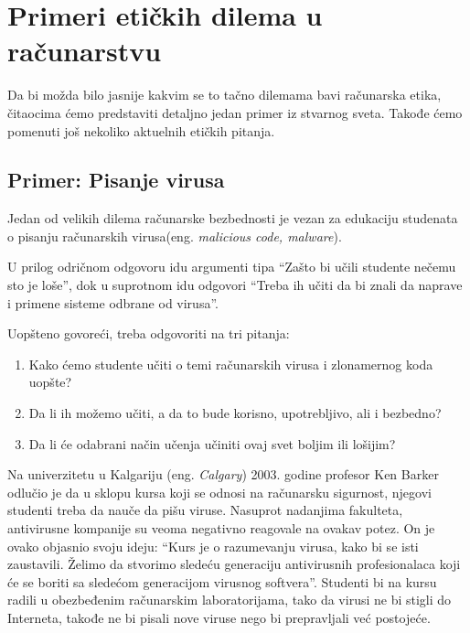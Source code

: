 \documentclass[a4paper]{article}
\begin{document}

\section{Primeri etičkih dilema u računarstvu}

Da bi možda bilo jasnije kakvim se to tačno dilemama bavi računarska etika, čitaocima ćemo predstaviti detaljno jedan primer iz stvarnog sveta. Takođe ćemo pomenuti još nekoliko aktuelnih etičkih pitanja.

\subsection{Primer: Pisanje virusa}
Jedan od velikih dilema računarske bezbednosti je vezan za edukaciju studenata o pisanju računarskih virusa(eng. \textit{malicious code, malware}).

U prilog odričnom odgovoru idu argumenti tipa ``Zašto bi učili studente nečemu sto je loše'', dok u suprotnom idu odgovori ``Treba ih učiti da bi znali da
naprave i primene sisteme odbrane od virusa''.

Uopšteno govoreći, treba odgovoriti na tri pitanja:
\begin{enumerate}
	\item Kako ćemo studente učiti o temi računarskih virusa i zlonamernog koda uopšte?
	\item Da li ih možemo učiti, a da to bude korisno, upotrebljivo, ali i bezbedno?
	\item Da li će odabrani način učenja učiniti ovaj svet boljim ili lošijim?
\end{enumerate}

Na univerzitetu u Kalgariju (eng. \textit{Calgary}) 2003. godine profesor Ken Barker odlučio je da u sklopu kursa koji se odnosi na računarsku sigurnost, njegovi
studenti treba da nauče da pišu viruse. Nasuprot nadanjima fakulteta, antivirusne kompanije su veoma negativno reagovale na ovakav potez.
On je ovako objasnio svoju ideju: ``Kurs je o razumevanju virusa, kako bi se isti zaustavili.
Želimo da stvorimo sledeću generaciju antivirusnih profesionalaca koji će se boriti sa sledećom generacijom virusnog softvera''.
Studenti bi na kursu radili u obezbeđenim računarskim laboratorijama, tako da virusi ne bi stigli do Interneta, takođe ne bi pisali nove viruse nego 
bi prepravljali već postojeće.
\end{document}
